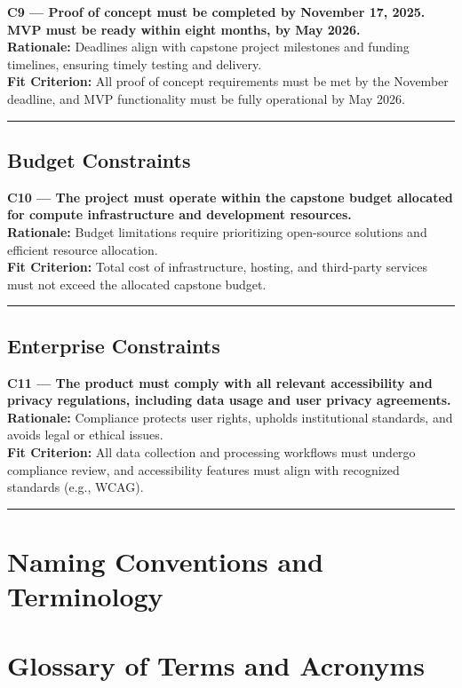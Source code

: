 \documentclass[11pt]{article}
\begin{document}
\noindent\textbf{C9 — Proof of concept must be completed by November 17, 2025. MVP must be ready within eight months, by May 2026.}\\
\textbf{Rationale:} Deadlines align with capstone project milestones and funding timelines, ensuring timely testing and delivery.\\
\textbf{Fit Criterion:} All proof of concept requirements must be met by the November deadline, and MVP functionality must be fully operational by May 2026.
\par\noindent\rule{\textwidth}{0.4pt}


\subsection{Budget Constraints}

\noindent\textbf{C10 — The project must operate within the capstone budget allocated for compute infrastructure and development resources.}\\
\textbf{Rationale:} Budget limitations require prioritizing open-source solutions and efficient resource allocation.\\
\textbf{Fit Criterion:} Total cost of infrastructure, hosting, and third-party services must not exceed the allocated capstone budget.
\par\noindent\rule{\textwidth}{0.4pt}


\subsection{Enterprise Constraints}

\noindent\textbf{C11 — The product must comply with all relevant accessibility and privacy regulations, including data usage and user privacy agreements.}\\
\textbf{Rationale:} Compliance protects user rights, upholds institutional standards, and avoids legal or ethical issues.\\
\textbf{Fit Criterion:} All data collection and processing workflows must undergo compliance review, and accessibility features must align with recognized standards (e.g., WCAG).
\par\noindent\rule{\textwidth}{0.4pt}


\section{Naming Conventions and Terminology}
\section*{Glossary of Terms and Acronyms}
\end{document}
